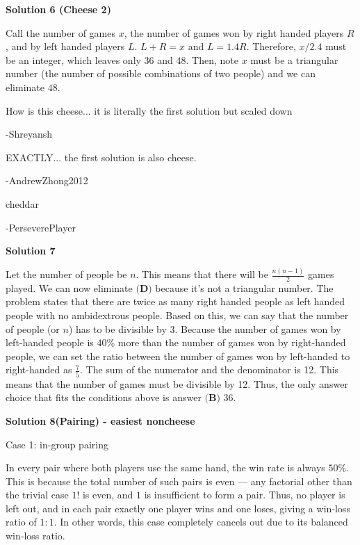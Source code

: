 \begin{enumerate}
 



\textbf{Solution 6 (Cheese 2)}

Call the number of games $x$, the number of games won by right handed players $R$, and by left handed players $L$. $L+R=x$ and $L=1.4 R$. Therefore, $x/2.4$ must be an integer, which leaves only $36$ and $48$. Then, note $x$ must be a triangular number (the number of possible combinations of two people) and we can eliminate $48$.

 
How is this cheese... it is literally the first solution but scaled down

 -Shreyansh

 EXACTLY... the first solution is also cheese.

 -AndrewZhong2012

 cheddar

 -PerseverePlayer

 



\textbf{Solution 7}

Let the number of people be $n$. This means that there will be $\frac{n(n-1)}{2}$ games played. We can now eliminate $\textbf{(D)}$ because it's not a triangular number. The problem states that there are twice as many right handed people as left handed people with no ambidextrous people. Based on this, we can say that the number of people (or $n$) has to be divisible by 3. Because the number of games won by left-handed people is 40\% more than the number of games won by right-handed people, we can set the ratio between the number of games won by left-handed to right-handed as $\frac{7}{5}$. The sum of the numerator and the denominator is 12. This means that the number of games must be divisible by 12. Thus, the only answer choice that fits the conditions above is answer $\boxed{\textbf{(B) }36}$.

 



\textbf{Solution 8(Pairing) - easiest noncheese}

Case 1: in-group pairing

 
In every pair where both players use the same hand, the win rate is always \(50\%\). This is because the total number of such pairs is even — any factorial other than the trivial case \(1!\) is even, and \(1\) is insufficient to form a pair. Thus, no player is left out, and in each pair exactly one player wins and one loses, giving a win‑loss ratio of \(1:1\). In other words, this case completely cancels out due to its balanced win‑loss ratio.


\end{enumerate}

